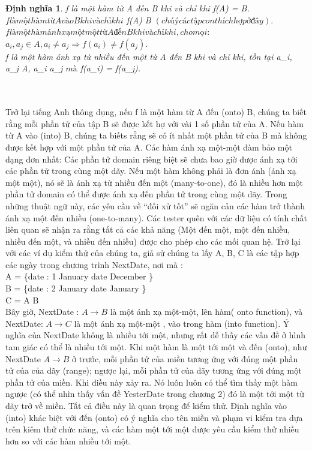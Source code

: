 \documentclass[11pt,a4paper,oneside]{article}
\newtheorem{modeling_def}{Định nghĩa }
\begin{document}
\begin{modeling_def}
f là một hàm từ A đến B khi và chỉ khi f\left(A\right) = B.\\
$f là một hàm từ A vào B khi và chỉ khi $ f\left(A\right) \subset B $(chú ý các tập con thích hợp ở đây).$\\
$f là một hàm ánh xạ một một từ A đến B khi và chỉ khi, cho mọi:$  \\
$a_{i}, a_{j} \in A, a_{i} \neq a_{j} \Rightarrow f\left(a_{i}\right) \neq f\left(a_{j}\right).$\\
f là một hàm ánh xạ từ nhiều đến một từ A đến B khi và chỉ khi, tồn tại a_{i}, a_{j} \in A, a_{i} \neq a_{j} $ mà $ f\left(a_{i}\right) = f\left(a_{j}\right).
\end{modeling_def}
\\
\\
Trở lại tiếng Anh thông dụng, nếu f là một hàm từ A đến (onto) B, chúng ta biết rằng mỗi phần tử của tập B sẽ được kết hợ với vài 1 số phần tử của A. Nếu hàm từ A vào (into) B, chúng ta biếts rằng sẽ có ít nhất một phần tử của B mà không được kết hợp với một phần tử của A. Các hàm ánh xạ một-một đàm bảo một dạng đơn nhất: Các phần tử domain riêng biệt sẽ chưa bao giờ được ánh xạ tới các phần tử trong cùng một dãy. Nếu một hàm không phải là đơn ánh (ánh xạ một một), nó sẽ là ánh xạ từ nhiều đến một (many-to-one), đó là nhiều hơn một phần tử domain có thể được ánh xạ đến phần tử trong cùng một dãy. Trong những thuật ngữ này, các yêu cầu về “đối xử tốt” sẽ ngăn cản các hàm trở thành ánh xạ một đến nhiều (one-to-many). Các tester quên với các dữ liệu có tính chất liên quan sẽ nhận ra rằng tất cả các khả năng (Một đến một, một đến nhiều, nhiều đến một, và nhiều đến nhiều) được cho phép cho các mối quan hệ. 
Trở lại với các ví dụ kiểm thử của chúng ta, giả sử chúng ta lấy A, B, C là các tập hợp các ngày trong chương trình NextDate, nơi mà :\\
\newline
A = \left\{date : 1 \; January  \leq date  \; December  \right\}\\
B = \left\{date : 2 \; January  \leq date  \; January  \right\}\\
C =  A \cup B\\


Bây giờ, NextDate : $ A \to B$  là một ánh xạ một-một, lên hàm( onto function), và NextDate: $A \to C$  là một ánh xạ một-một , vào trong hàm (into function). Ý nghĩa của NextDate không là nhiều tới một, nhưng rất dễ thấy các vấn đề ở hình tam giác có thể là nhiều tới một. Khi một hàm là một tới một và đến (onto), như NextDate $ A \to B $ ở trước, mỗi phần tử của miền tương ứng với đúng một phần tử của của dãy (range); ngược lại, mỗi phần tử của dãy tương ứng với đúng một phần tử của miền. Khi điều này xảy ra. Nó luôn luôn có thể tìm thấy một hàm ngược (có thể nhìn thấy vấn đề YesterDate trong chương 2) đó là một tới một từ dãy trở về miền.
Tất cả điều này là quan trọng để kiểm thử. Định nghĩa vào (into) khác biệt với đến (onto) có ý nghĩa cho tên miền và phạm vi kiểm tra dựa trên kiêm thử chức năng, và các hàm một tới một được yêu cầu kiểm thử nhiều hơn so với các hàm nhiều tới một.
\end{document}

